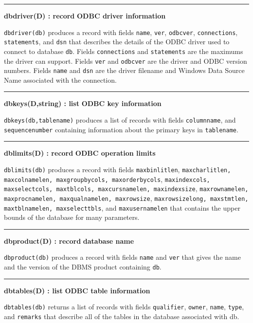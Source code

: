 \bigskip\hrule\vspace{0.1cm}
\noindent
{\bf dbdriver(D) : record } \hfill {\bf ODBC driver information}

\noindent
{}\texttt{dbdriver(db)} produces a record with fields
\texttt{name}, \texttt{ver}, \texttt{odbcver}, \texttt{connections},
\texttt{statements}, and \texttt{dsn} that describes the details of
the ODBC driver used to connect to database \texttt{db}.
Fields \texttt{connections} and \texttt{statements} are the maximums
the driver can support. Fields
\texttt{ver} and \texttt{odbcver} are the driver and ODBC version
numbers. Fields \texttt{name} and \texttt{dsn} are the driver filename
and Windows Data Source Name associated with the connection.

\bigskip\hrule\vspace{0.1cm}
\noindent
{\bf dbkeys(D,string) : list } \hfill {\bf ODBC key information}

\noindent
{}\texttt{dbkeys(db,tablename)} produces a list of records
with fields \texttt{columnname}, and \texttt{sequencenumber}
containing information about the primary keys in \texttt{tablename}.

\bigskip\hrule\vspace{0.1cm}
\noindent
{\bf dblimits(D) : record } \hfill {\bf ODBC operation limits}

\noindent
\texttt{dblimits(db)} produces a record with fields \texttt{maxbinlitlen},
\texttt{maxcharlitlen, maxcolnamelen, maxgroupbycols, maxorderbycols},
\texttt{maxindexcols, maxselectcols, maxtblcols, maxcursnamelen, maxindexsize},
\texttt{maxrownamelen, maxprocnamelen, maxqualnamelen, maxrowsize},
\texttt{maxrowsizelong, maxstmtlen, maxtblnamelen, maxselecttbls}, and
\texttt{maxusernamelen} that contains the upper bounds of the database
for many parameters.

\bigskip\hrule\vspace{0.1cm}
\noindent
{\bf dbproduct(D) : record } \hfill {\bf database name}

\noindent
\texttt{dbproduct(db)} produces a record with fields \texttt{name}
and \texttt{ver} that gives the name and the
version of the DBMS product containing \texttt{db}.

\bigskip\hrule\vspace{0.1cm}
\noindent
{\bf dbtables(D) : list } \hfill {\bf ODBC table information}

\noindent
\texttt{dbtables(db)} returns a list of records with fields
\texttt{qualifier}, \texttt{owner}, \texttt{name}, \texttt{type}, and
\texttt{remarks} that describe all of the tables in the database
associated with db.

